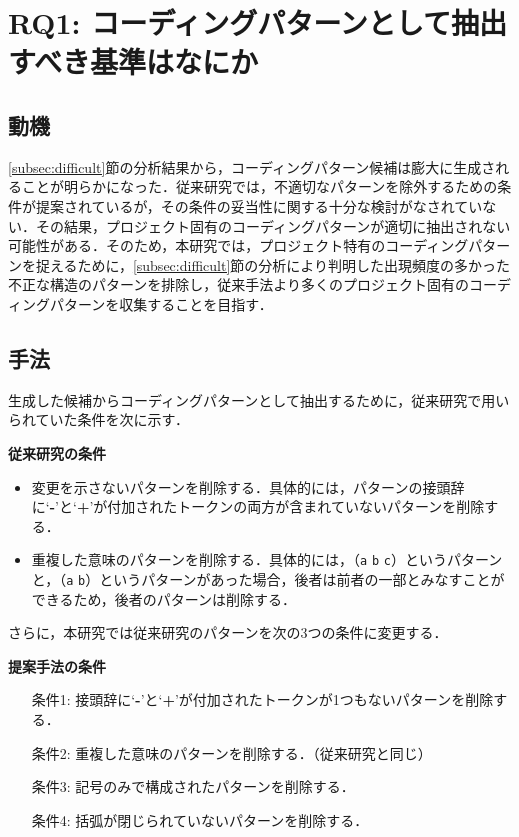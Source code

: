 \documentclass[submit,techrep,noauthor]{ipsj}
\newcommand{\RQone}{コーディングパターンとして抽出すべき基準はなにか}
\begin{document}
\section{RQ1: \RQone}\label{sec:filter}
\subsection{動機}
\ref{subsec:difficult}節の分析結果から，コーディングパターン候補は膨大に生成されることが明らかになった．従来研究では，不適切なパターンを除外するための条件が提案されているが，その条件の妥当性に関する十分な検討がなされていない．その結果，プロジェクト固有のコーディングパターンが適切に抽出されない可能性がある．そのため，本研究では，プロジェクト特有のコーディングパターンを捉えるために，\ref{subsec:difficult}節の分析により判明した出現頻度の多かった不正な構造のパターンを排除し，従来手法より多くのプロジェクト固有のコーディングパターンを収集することを目指す．
\subsection{手法}
生成した候補からコーディングパターンとして抽出するために，従来研究で用いられていた条件を次に示す．

\textbf{従来研究の条件}
\begin{itemize}
    \item 変更を示さないパターンを削除する．具体的には，パターンの接頭辞に`\textbf{-}'と`\textbf{+}'が付加されたトークンの両方が含まれていないパターンを削除する．
    \item 重複した意味のパターンを削除する．具体的には，（\colorbox{lightgray!50}{\texttt{a}} \colorbox{lightgray!50}{\texttt{b}} \colorbox{lightgray!50}{\texttt{c}}）というパターンと，（\colorbox{lightgray!50}{\texttt{a}} \colorbox{lightgray!50}{\texttt{b}}）というパターンがあった場合，後者は前者の一部とみなすことができるため，後者のパターンは削除する．
\end{itemize}

さらに，本研究では従来研究のパターンを次の3つの条件に変更する．

\textbf{提案手法の条件}
\begin{itemize}
    \item[条件1: ] 接頭辞に`\textbf{-}'と`\textbf{+}'が付加されたトークンが1つもないパターンを削除する．
    \item[条件2: ] 重複した意味のパターンを削除する．（従来研究と同じ）
    \item[条件3: ] 記号のみで構成されたパターンを削除する．
    \item[条件4: ] 括弧が閉じられていないパターンを削除する．
\end{itemize}
\end{document}
